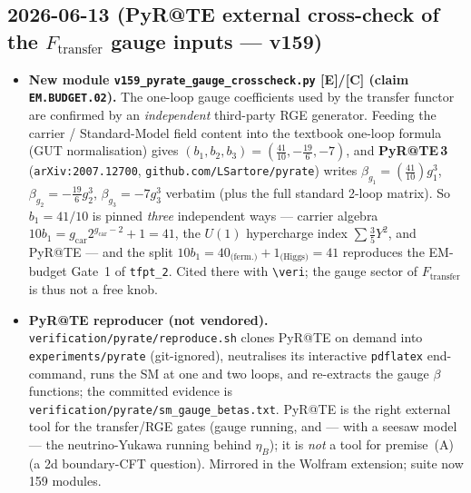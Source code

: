 \documentclass[11pt]{article}
\providecommand{\mE}{\textbf{[E]}}\providecommand{\mC}{\textbf{[C]}}
\providecommand{\gcar}{g_{\mathrm{car}}}\providecommand{\Nfam}{N_{\mathrm{fam}}}
\begin{document}
\subsection*{2026-06-13 (PyR@TE external cross-check of the $F_{\mathrm{transfer}}$ gauge inputs --- v159)}
\begin{itemize}
\item \textbf{New module \texttt{v159\_pyrate\_gauge\_crosscheck.py} \mE/\mC{} (claim
  \texttt{EM.BUDGET.02}).} The one-loop gauge coefficients used by the transfer functor
  are confirmed by an \emph{independent} third-party RGE generator. Feeding the carrier
  / Standard-Model field content into the textbook one-loop formula (GUT normalisation)
  gives $(b_1,b_2,b_3)=(\tfrac{41}{10},-\tfrac{19}{6},-7)$, and \textbf{PyR@TE\,3}
  (\texttt{arXiv:2007.12700}, \texttt{github.com/LSartore/pyrate}) writes
  $\beta_{g_1}=(\tfrac{41}{10})g_1^3$, $\beta_{g_2}=-\tfrac{19}{6}g_2^3$,
  $\beta_{g_3}=-7g_3^3$ verbatim (plus the full standard 2-loop matrix). So $b_1=41/10$
  is pinned \emph{three} independent ways --- carrier algebra
  $10b_1=\gcar 2^{\gcar-2}{+}1=41$, the $U(1)$ hypercharge index $\sum\tfrac35 Y^2$, and
  PyR@TE --- and the split $10b_1=40_{\text{(ferm.)}}+1_{\text{(Higgs)}}=41$ reproduces
  the EM-budget Gate~1 of \texttt{tfpt\_2}. Cited there with \texttt{\textbackslash veri};
  the gauge sector of $F_{\mathrm{transfer}}$ is thus not a free knob.
\item \textbf{PyR@TE reproducer (not vendored).} \texttt{verification/pyrate/reproduce.sh}
  clones PyR@TE on demand into \texttt{experiments/pyrate} (git-ignored), neutralises its
  interactive \texttt{pdflatex} end-command, runs the SM at one and two loops, and
  re-extracts the gauge $\beta$ functions; the committed evidence is
  \texttt{verification/pyrate/sm\_gauge\_betas.txt}. PyR@TE is the right external tool for
  the transfer/RGE gates (gauge running, and --- with a seesaw model --- the
  neutrino-Yukawa running behind $\eta_B$); it is \emph{not} a tool for premise~(A) (a
  2d boundary-CFT question). Mirrored in the Wolfram extension; suite now 159 modules.
\end{itemize}
\end{document}
